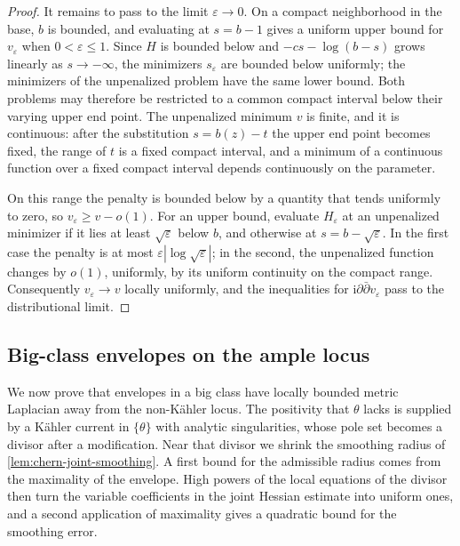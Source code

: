 \begin{proof}
It remains to pass to the limit $\varepsilon\to0$. On a compact neighborhood in the base, $b$ is bounded, and evaluating at $s=b-1$ gives a uniform upper bound for $v_\varepsilon$ when $0<\varepsilon\leq1$. Since $H$ is bounded below and $-cs-\log(b-s)$ grows linearly as $s\to-\infty$, the minimizers $s_\varepsilon$ are bounded below uniformly; the minimizers of the unpenalized problem have the same lower bound. Both problems may therefore be restricted to a common compact interval below their varying upper end point. The unpenalized minimum $v$ is finite, and it is continuous: after the substitution $s=b(z)-t$ the upper end point becomes fixed, the range of $t$ is a fixed compact interval, and a minimum of a continuous function over a fixed compact interval depends continuously on the parameter.

On this range the penalty is bounded below by a quantity that tends uniformly to zero, so $v_\varepsilon\geq v-o(1)$. For an upper bound, evaluate $H_\varepsilon$ at an unpenalized minimizer if it lies at least $\sqrt\varepsilon$ below $b$, and otherwise at $s=b-\sqrt\varepsilon$. In the first case the penalty is at most $\varepsilon|\log\sqrt\varepsilon|$; in the second, the unpenalized function changes by $o(1)$, uniformly, by its uniform continuity on the compact range. Consequently $v_\varepsilon\to v$ locally uniformly, and the inequalities for $\mathrm i\partial\bar\partial v_\varepsilon$ pass to the distributional limit.
\end{proof}

\subsection{Big-class envelopes on the ample locus}
\label{sec:big-envelope-metric-regularity}
We now prove that envelopes in a big class have locally bounded metric Laplacian away from the non-K\"ahler locus. The positivity that $\theta$ lacks is supplied by a K\"ahler current in $\{\theta\}$ with analytic singularities, whose pole set becomes a divisor after a modification. Near that divisor we shrink the smoothing radius of \cref{lem:chern-joint-smoothing}. A first bound for the admissible radius comes from the maximality of the envelope. High powers of the local equations of the divisor then turn the variable coefficients in the joint Hessian estimate into uniform ones, and a second application of maximality gives a quadratic bound for the smoothing error.

